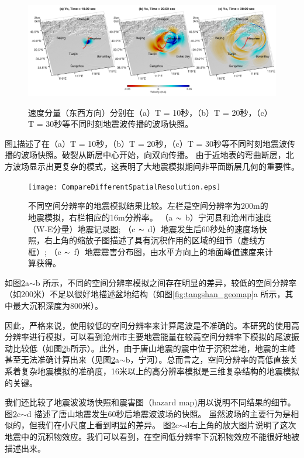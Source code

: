 \documentclass[degree=doctor]{thuthesis}
\begin{document}
\begin{figure}[ht]
    \includegraphics[width=1.0\columnwidth]{Snap_Vx_tangshan.pdf}\\
    \caption{速度分量（东西方向）分别在（a）T = 10秒，（b）T = 20秒，（c）T = 30秒等不同时刻地震波传播的波场快照。}
    \label{fig:strong_motion_2}
\end{figure}

图\ref{fig:strong_motion_2}描述了在（a）T = 10秒，（b）T = 20秒，（c）T = 30秒等不同时刻地震波传播的波场快照。破裂从断层中心开始，向双向传播。 由于近地表的弯曲断层，北方波场显示出更复杂的模式，这表明了大地震模拟期间非平面断层几何的重要性。

\begin{figure}[t]
  \centering
  \texttt{[image: CompareDifferentSpatialResolution.eps]}\\
  \caption{
不同空间分辨率的地震模拟结果比较。左栏是空间分辨率为200m的地震模拟，右栏相应的16m分辨率。 （a $ \thicksim $ b）宁河县和沧州市速度（W-E分量）地震记录图; （c $ \thicksim $ d）地震发生后60秒处的速度场快照，右上角的缩放子图描述了具有沉积作用的区域的细节（虚线方框）; （e $ \thicksim $ f）地震震害分布图，由水平方向上的地面峰值速度来计算获得。}
  \label{fig:strong_motion}
\end{figure}

如图\ref{fig:strong_motion}a$\sim$b 所示，不同的空间分辨率模拟之间存在明显的差异，较低的空间分辨率（如200米）不足以很好地描述盆地结构（如图\ref{fig:tangshan_geomap}a 所示，其中最大沉积深度为800米）。


因此，严格来说，使用较低的空间分辨率来计算尾波是不准确的。本研究的使用高分辨率进行模拟，可以看到沧州市主要地震能量在较高空间分辨率下模拟的尾波振动比较低（如图\ref{fig:strong_motion}b所示）。此外，由于唐山地震的震中位于沉积盆地，地震的主峰甚至无法准确计算出来（见图\ref{fig:strong_motion}a$\sim$b，宁河）。总而言之，空间分辨率的高低直接关系着复杂地震模拟的准确度，16米以上的高分辨率模拟是三维复杂结构的地震模拟的关键。

我们还比较了地震波波场快照和震害图（hazard map)用以说明不同结果的细节。 图\ref{fig:strong_motion}c$\sim$d 描述了唐山地震发生60秒后地震波波场的快照。 虽然波场的主要行为是相似的，但我们在小尺度上看到明显的差异。 图\ref{fig:strong_motion}c$\sim$d右上角的放大图片说明了这次地震中的沉积物效应。我们可以看到，在空间低分辨率下沉积物效应不能很好地被描述出来。
\end{document}
